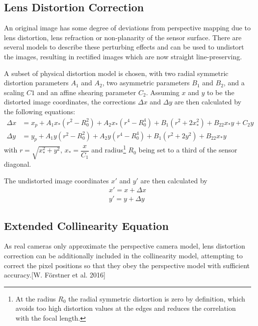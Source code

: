\subsection{Lens Distortion Correction}
\label{subsec:LensDistortion}

An original image has some degree of deviations from perspective mapping due to lens distortion, lens refraction or non-planarity of the sensor surface. There are several models to describe these perturbing effects and can be used to undistort the images, resulting in rectified images which are now straight line-preserving.
 
A subset of physical distortion model \cite{Fraser1997} is chosen, with two radial symmetric distortion parameters $A_1$ and $A_2$, two asymmetric parameters $B_1$ and $B_2$, and a scaling $C1$ and an affine shearing parameter $C_2$. Assuming $x$ and $y$ to be the distorted image coordinates, the corrections $\Delta x$ and $\Delta y$ are then calculated by the following equations:
\begin{equation} \label{eq:LensDistortion}
\begin{split}
\Delta x &= x_p + A_1x_*(r^2-R_0^2) + A_2x_*(r^4-R_0^4) + B_1(r^2+2x_*^2) + B_22x_*y+C_2y \\
\Delta y &= y_p + A_1y  (r^2-R_0^2) + A_2y  (r^4-R_0^4) + B_1(r^2+2y^2)   + B_22x_*y
\end{split}
\end{equation}
with $r=\sqrt{x_*^2+y^2}$, $x_*=\dfrac{x}{C_1}$ and radius\footnote{At the radius $R_0$ the radial symmetric distortion is zero by definition, which avoids too high distortion values at the edges and reduces the correlation with the focal length.} $R_0$ being set %
to a third of the sensor diagonal.

The undistorted image coordinates $x\prime$ and $y\prime$ are then calculated by
\begin{equation} \label{eq:undistortedimgcoord}
\begin{split}
x\prime=x+\Delta x \\
y\prime=y+\Delta y
\end{split}
\end{equation}

\subsection{Extended Collinearity Equation}
\label{subsec:ExtendedCollinearity}
As real cameras only approximate the perspective camera model, lens distortion correction can be additionally included in the collinearity model, attempting to correct the pixel positions so that they obey the perspective model with sufficient accuracy.[W. Förstner et al. 2016]%

